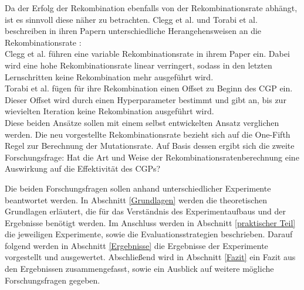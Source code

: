 Da der Erfolg der Rekombination ebenfalls von der Rekombinationsrate abhängt, ist es sinnvoll diese näher zu betrachten. 
Clegg et al. und Torabi et al. beschreiben in ihren Papern unterschiedliche Herangehensweisen an die Rekombinationsrate \cite{clegg_new_2007, torabi_using_2022}:\\
Clegg et al. führen eine variable Rekombinationsrate in ihrem Paper ein.
Dabei wird eine hohe Rekombinationsrate linear verringert, sodass in den letzten Lernschritten keine Rekombination mehr ausgeführt wird. \cite{clegg_new_2007}\\
Torabi et al. fügen für ihre Rekombination einen Offset zu Beginn des CGP ein. 
Dieser Offset wird durch einen Hyperparameter bestimmt und gibt an, bis zur wievielten Iteration keine Rekombination ausgeführt wird. \cite{torabi_using_2022}\\
Diese beiden Ansätze sollen mit einem selbst entwickelten Ansatz verglichen werden.
Die neu vorgestellte Rekombinationsrate bezieht sich auf die One-Fifth Regel zur Berechnung der Mutationsrate.
Auf Basis dessen ergibt sich die zweite Forschungsfrage: \glqq Hat die Art und Weise der Rekombinationsratenberechnung eine Auswirkung auf die Effektivität des CGPs?\grqq

Die beiden Forschungsfragen sollen anhand unterschiedlicher Experimente beantwortet werden.
In Abschnitt \ref{Grundlagen} werden die theoretischen Grundlagen erläutert, die für das Verständnis des Experimentaufbaus und der Ergebnisse benötigt werden.
Im Anschluss werden in Abschnitt \ref{praktischer Teil} die jeweiligen Experimente, sowie die Evaluationsstrategien beschrieben.
Darauf folgend werden in Abschnitt \ref{Ergebnisse} die Ergebnisse der Experimente vorgestellt und ausgewertet.
Abschließend wird in Abschnitt \ref{Fazit} ein Fazit aus den Ergebnissen zusammengefasst, sowie ein Ausblick auf weitere mögliche Forschungsfragen gegeben.
